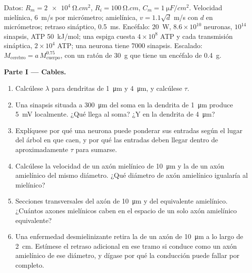 \begin{problem}
\label{pb:b3:nervous-systems:1}
Datos: $R_{m} = \qty{2e4}{\ohm.cm^2}$, $R_{i} = \qty{100}{\ohm.cm}$,
$C_{m} = \qty{1}{\micro F/cm^2}$. Velocidad mielínica, \qty{6}{m/s} por
micrómetro; amielínica, $v = 1.1\sqrt{d}$ m/s con $d$ en micrómetros;
retraso sináptico, \qty{0.5}{ms}. Encéfalo: \qty{20}{W},
$8.6\times 10^{10}$ neuronas, $10^{14}$ sinapsis, ATP \qty{50}{kJ/mol};
una espiga cuesta $4\times 10^{8}$ ATP y cada transmisión sináptica,
$2\times 10^{4}$ ATP; una neurona tiene \num{7000} sinapsis. Escalado:
$M_{\text{cerebro}} = a\,M_{\text{cuerpo}}^{0.75}$, con un ratón de
\qty{30}{g} que tiene un encéfalo de \qty{0.4}{g}.

\medskip
\noindent\textbf{Parte I --- Cables.}
\begin{enumerate}
  \item Calcúlese $\lambda$ para dendritas de \qty{1}{\micro m} y
        \qty{4}{\micro m}, y calcúlese $\tau$.
  \item Una sinapsis situada a \qty{300}{\micro m} del soma en la
        dendrita de \qty{1}{\micro m} produce \qty{5}{mV} localmente.
        ¿Qué llega al soma? ¿Y en la dendrita de \qty{4}{\micro m}?
  \item Explíquese por qué una neurona puede ponderar sus entradas
        según el lugar del árbol en que caen, y por qué las entradas
        deben llegar dentro de aproximadamente $\tau$ para sumarse.
  \item Calcúlese la velocidad de un axón mielínico de
        \qty{10}{\micro m} y la de un axón amielínico del mismo
        diámetro. ¿Qué diámetro de axón amielínico igualaría al
        mielínico?
  \item Secciones transversales del axón de \qty{10}{\micro m} y del
        equivalente amielínico. ¿Cuántos axones mielínicos caben en el
        espacio de un solo axón amielínico equivalente?
  \item Una enfermedad desmielinizante retira la  de un axón de
        \qty{10}{\micro m} a lo largo de \qty{2}{cm}. Estímese el
        retraso adicional en ese tramo si conduce como un axón
        amielínico de ese diámetro, y dígase por qué la conducción
        puede fallar por completo.
\end{enumerate}


\end{problem}
